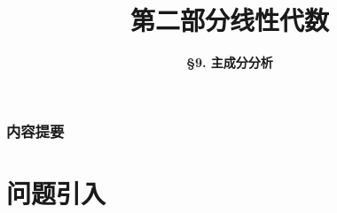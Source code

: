 



\title[Linear Algebra]{\LARGE \bfseries 第二部分\quad 线性代数} %
\author[PCA] %
{\Large \bfseries \S 9. 主成分分析}
\date{}






\begin{frame}

\titlepage %

\end{frame}


\begin{frame}
\frametitle{内容提要} %
\tableofcontents %
\end{frame}



\section{问题引入}


